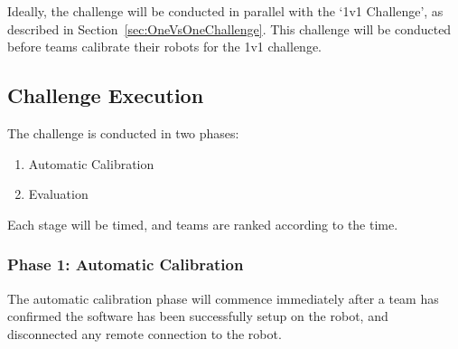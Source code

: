 Ideally, the challenge will be conducted in parallel with the `1v1 Challenge', as described in Section~\ref{sec:OneVsOneChallenge}.
This challenge will be conducted before teams calibrate their robots for the 1v1 challenge.

\subsection{Challenge Execution}

The challenge is conducted in two phases:
\begin{enumerate}
    \item Automatic Calibration
    \item Evaluation
\end{enumerate}

Each stage will be timed, and teams are ranked according to the time.

\subsubsection{Phase 1: Automatic Calibration}

The automatic calibration phase will commence immediately after a team has confirmed the software has been successfully setup on the robot, and disconnected any remote connection to the robot.

